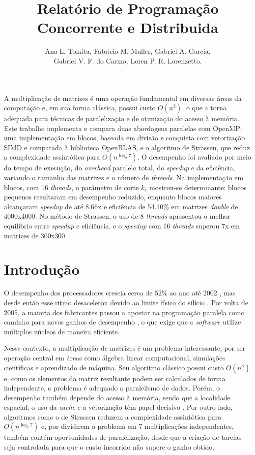 \documentclass[12pt]{article}
\title{Relatório de Programação Concorrente e Distribuida}
\author{Ana L. Tomita\inst{1}, Fabricio M. Muller\inst{1}, Gabriel A. Garcia\inst{1}, \\Gabriel V. F. do Carmo\inst{1}, Loren P. R. Lorenzetto\inst{1}. }
\begin{document}
 


\maketitle
     
\begin{resumo} 
  A multiplicação de matrizes é uma operação fundamental em diversas áreas da computação e, em sua forma clássica, possui custo $O(n^3)$, o que a torna adequada para técnicas de paralelização e de otimização do acesso à memória. Este trabalho implementa e compara duas abordagens paralelas com OpenMP: uma implementação em blocos, baseada em divisão e conquista com vetorização SIMD e comparada à biblioteca OpenBLAS, e o algoritmo de Strassen, que reduz a complexidade assintótica para $O(n^{\log_{2}7})$. O desempenho foi avaliado por meio do tempo de execução, do \textit{overhead} paralelo total, do \textit{speedup} e da eficiência, variando o tamanho das matrizes e o número de \textit{threads}. Na implementação em blocos, com 16 \textit{threads}, o parâmetro de corte $k_c$ mostrou-se determinante: blocos pequenos resultaram em desempenho reduzido, enquanto blocos maiores alcançaram \textit{speedup} de até 8.66x e eficiência de 54.10\% em matrizes \textit{double} de 4000x4000. No método de Strassen, o uso de 8 \textit{threads} apresentou o melhor equilíbrio entre \textit{speedup} e eficiência, e o \textit{speedup} com 16 \textit{threads} superou 7x em matrizes de 300x300.
\end{resumo}


\section{Introdução}

O desempenho dos processadores crescia cerca de 52\% ao ano até 2002 \cite{herlihy2008}, mas desde então esse ritmo desacelerou devido ao limite físico do silício \cite{hennessy2017}. Por volta de 2005, a maioria dos fabricantes passou a apostar na programação paralela como caminho para novos ganhos de desempenho \cite{pacheco2011}, o que exige que o \textit{software} utilize múltiplos núcleos de maneira eficiente.

Nesse contexto, a multiplicação de matrizes é um problema interessante, por ser operação central em áreas como álgebra linear computacional, simulações científicas e aprendizado de máquina. Seu algoritmo clássico possui custo $O(n^3)$ \cite{cormen2012} e, como os elementos da matriz resultante podem ser calculados de forma independente, o problema é adequado a paralelismo de dados. Porém, o desempenho também depende do acesso à memória, sendo que a localidade espacial, o uso da \textit{cache} e a vetorização têm papel decisivo \cite{hennessy2017, allen2002}. Por outro lado, algoritmos como o de Strassen reduzem a complexidade assintótica para $O(n^{\log_{2}7})$ \cite{ikenmeyer2019strassen} e, por dividirem o problema em 7 multiplicações independentes, também contém oportunidades de paralelização, desde que a criação de tarefas seja controlada para que o custo incorrido não supere o ganho obtido.
\end{document}
